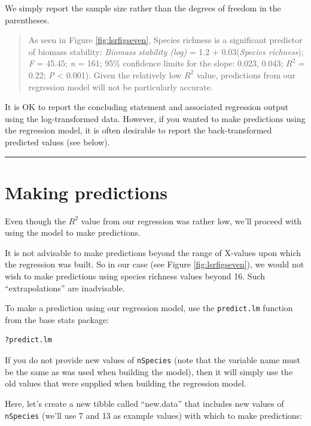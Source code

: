 \documentclass[
]{book}
\begin{document}
We simply report the sample size rather than the degrees of freedom in the parentheses.

\begin{quote}
As seen in Figure \ref{fig:lsrfigseven}, Species richness is a significant predictor of biomass stability: \emph{Biomass stability (log)} = 1.2 + 0.03(\emph{Species richness}); \emph{F} = 45.45; \emph{n} = 161; 95\% confidence limits for the slope: 0.023, 0.043; \(R^2\) = 0.22; \emph{P} \textless{} 0.001). Given the relatively low \(R^2\) value, predictions from our regression model will not be particularly accurate.
\end{quote}

It is OK to report the concluding statement and associated regression output using the log-transformed data. However, if you wanted to make predictions using the regression model, it is often desirable to report the back-transformed predicted values (see below).

\begin{center}\rule{0.5\linewidth}{0.5pt}\end{center}

\section{Making predictions}\label{making-predictions}

Even though the \(R^2\) value from our regression was rather low, we'll proceed with using the model to make predictions.

It is not advisable to make predictions beyond the range of X-values upon which the regression was built. So in our case (see Figure \ref{fig:lsrfigseven}), we would not wish to make predictions using species richness values beyond 16. Such ``extrapolations'' are inadvisable.

To make a prediction using our regression model, use the \texttt{predict.lm} function from the base stats package:

\begin{verbatim}
?predict.lm
\end{verbatim}

If you do not provide new values of \texttt{nSpecies} (note that the variable name must be the same as was used when building the model), then it will simply use the old values that were supplied when building the regression model.

Here, let's create a new tibble called ``new.data'' that includes new values of \texttt{nSpecies} (we'll use 7 and 13 as example values) with which to make predictions:
\end{document}
